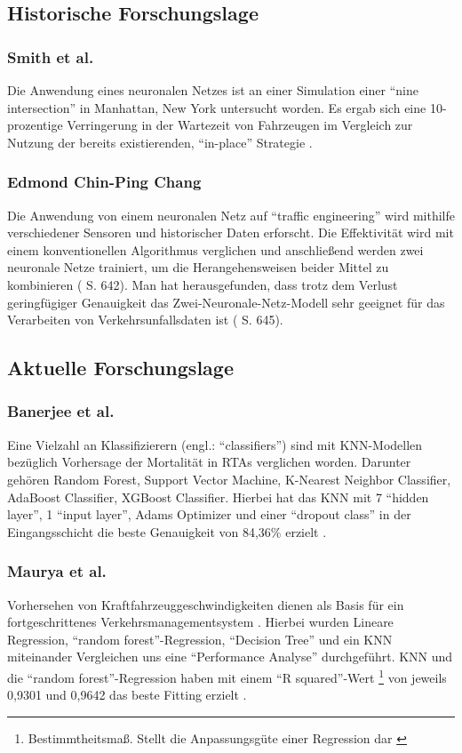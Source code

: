 \documentclass{scrartcl}
\begin{document}
\subsection{Historische Forschungslage}

\subsubsection{Smith et al.}
Die Anwendung eines neuronalen Netzes ist an einer Simulation einer
\enquote{nine intersection} in Manhattan, New York untersucht worden.
Es ergab sich eine 10-prozentige Verringerung in der Wartezeit von Fahrzeugen
im Vergleich zur Nutzung der bereits existierenden, \enquote{in-place} Strategie \cite{smith}.

\subsubsection{Edmond Chin-Ping Chang}
Die Anwendung von einem neuronalen Netz auf \enquote{traffic engineering} wird mithilfe 
verschiedener Sensoren und historischer Daten erforscht. Die Effektivität wird mit
einem konventionellen Algorithmus verglichen und anschließend werden zwei neuronale Netze
trainiert, um die Herangehensweisen beider Mittel zu kombinieren (\cite{chang} S. 642).
Man hat herausgefunden, dass trotz dem Verlust geringfügiger Genauigkeit das Zwei-Neuronale-Netz-Modell
sehr geeignet für das Verarbeiten von Verkehrsunfallsdaten ist (\cite{chang} S. 645).

\subsection{Aktuelle Forschungslage}

\subsubsection{Banerjee et al.}
Eine Vielzahl an Klassifizierern (engl.: \enquote{classifiers}) sind mit
KNN-Modellen bezüglich Vorhersage der Mortalität in RTAs verglichen worden.
Darunter gehören
Random Forest, Support Vector Machine, K-Nearest Neighbor Classifier,
AdaBoost Classifier, XGBoost Classifier. Hierbei hat das KNN mit 7
\enquote{hidden layer}, 1 \enquote{input layer}, Adams Optimizer und einer
\enquote{dropout class} in der Eingangsschicht die beste Genauigkeit von 84,36\%
erzielt \cite{akt1}.

\subsubsection{Maurya et al.}
Vorhersehen von Kraftfahrzeuggeschwindigkeiten dienen als Basis für ein
fortgeschrittenes Verkehrsmanagementsystem \cite{akt2}. Hierbei wurden
Lineare Regression, \enquote{random forest}-Regression, \enquote{Decision Tree} und
ein KNN miteinander Vergleichen uns eine \enquote{Performance Analyse} durchgeführt.
KNN und die \enquote{random forest}-Regression haben mit einem
\enquote{R squared}-Wert \footnote{Bestimmtheitsmaß.
   Stellt die Anpassungsgüte einer Regression dar \cite{rsquared}}
von jeweils 0,9301 und 0,9642 das beste Fitting erzielt \cite{akt2}.
\end{document}
